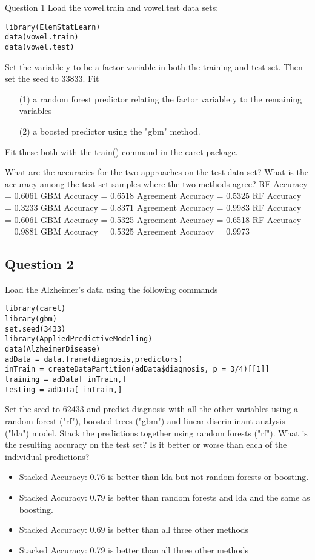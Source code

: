 Question 1
Load the vowel.train and vowel.test data sets:
\begin{framed}
\begin{verbatim}
library(ElemStatLearn)
data(vowel.train)
data(vowel.test) 
\end{verbatim}
\end{framed}
Set the variable y to be a factor variable in both the training and test set. Then set the seed to 33833. 
Fit 
\begin{itemize}
\item[(1)] a random forest predictor relating the factor variable y to the remaining variables 
\item[(2)] a boosted predictor using the "gbm" method. 
\end{itemize}
Fit these both with the train() command in the caret package. 

What are the accuracies for the two approaches on the test data set? What is the accuracy among the test set samples where the two methods agree?
RF Accuracy = 0.6061 
GBM Accuracy = 0.6518 
Agreement Accuracy = 0.5325
RF Accuracy = 0.3233 
GBM Accuracy = 0.8371 
Agreement Accuracy = 0.9983
RF Accuracy = 0.6061 
GBM Accuracy = 0.5325 
Agreement Accuracy = 0.6518
RF Accuracy = 0.9881 
GBM Accuracy = 0.5325 
Agreement Accuracy = 0.9973
\subsection{Question 2}
Load the Alzheimer's data using the following commands
\begin{framed}
\begin{verbatim}
library(caret)
library(gbm)
set.seed(3433)
library(AppliedPredictiveModeling)
data(AlzheimerDisease)
adData = data.frame(diagnosis,predictors)
inTrain = createDataPartition(adData$diagnosis, p = 3/4)[[1]]
training = adData[ inTrain,]
testing = adData[-inTrain,]
\end{verbatim}
\end{framed}

Set the seed to 62433 and predict diagnosis with all the other variables using a random forest ("rf"), boosted trees ("gbm") and linear discriminant analysis ("lda") model. Stack the predictions together using random forests ("rf"). What is the resulting accuracy on the test set? Is it better or worse than each of the individual predictions?
\begin{itemize}
\item Stacked Accuracy: 0.76 is better than lda but not random forests or boosting.
\item Stacked Accuracy: 0.79 is better than random forests and lda and the same as boosting.
\item Stacked Accuracy: 0.69 is better than all three other methods
\item Stacked Accuracy: 0.79 is better than all three other methods
\end{itemize}
